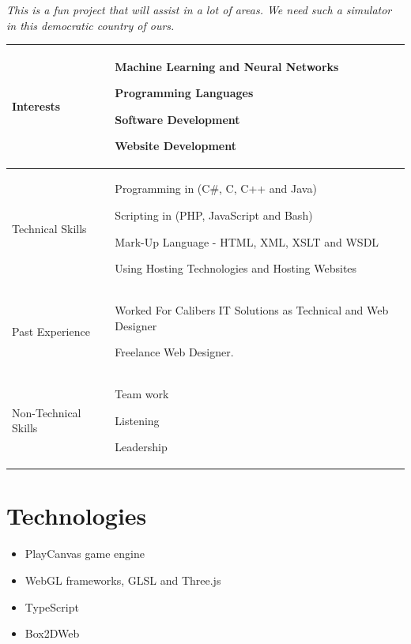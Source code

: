 \documentclass{article}
\begin{document}
 	\textit{This is a fun project that will assist in a lot of areas. We need such a simulator in this democratic country of ours.}

\begin{center}
\begin{tabularx}{1.0\textwidth}{|p{3cm}|X|}
\hline
 {\LARGE Interests} & 
 \begin{compactitem}
     \item {\large Machine Learning and Neural Networks}
     \item {\large Programming Languages}
     \item {\large Software Development}
     \item {\large Website Development}
 \end{compactitem} \\ 
 \hline
 {\LARGE Technical Skills} & 
 \begin{compactitem}
     \item {\large Programming in (C#, C, C++ and Java)} 
     \item {\large Scripting in (PHP, JavaScript and Bash)}
     \item {\large Mark-Up Language - HTML, XML, XSLT and WSDL}
     \item {\large Using Hosting Technologies and Hosting Websites}
 \end{compactitem} \\ 
 \hline
 {\LARGE Past Experience} & 
 \begin{compactitem}
     \item {\large Worked For Calibers IT Solutions as Technical and Web Designer}
     \item {\large Freelance Web Designer.}
 \end{compactitem} \\ 
 \hline
 {\LARGE Non-Technical Skills} & 
 \begin{compactitem}
     \item {\large Team work}
     \item {\large Listening}
     \item {\large Leadership}
 \end{compactitem} \\
 \hline 
\end{tabularx}
\end{center}
\pagebreak
\section{Technologies}
\begin{itemize}
	\item PlayCanvas game engine
	\item WebGL frameworks, GLSL and Three.js
	\item TypeScript
	\item Box2DWeb
\end{itemize}
\end{document}
